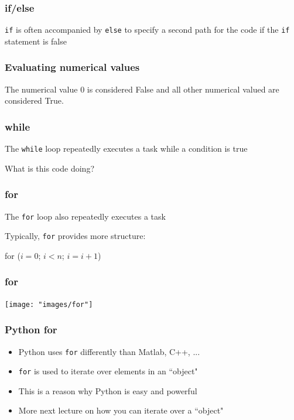 \documentclass{beamer}
\begin{document}
\begin{frame}
\frametitle{if/else}
\texttt{if} is often accompanied by \texttt{else} to specify a second path for the code if the \texttt{if} statement is false



\end{frame}

\begin{frame}
\frametitle{Evaluating numerical values}

The numerical value 0 is considered False and all other numerical valued are considered True.



\end{frame}

\begin{frame}
\frametitle{while}
The \texttt{while} loop repeatedly executes a task while a condition is true



What is this code doing?

\end{frame}

\begin{frame}
\frametitle{for}
The \texttt{for} loop also repeatedly executes a task

\vspace{0.1in}

Typically, \texttt{for} provides more structure:

\vspace{0.1in}

\centering
for ($i = 0$; $i < n$; $i = i + 1$)

\end{frame}

\begin{frame}
\frametitle{for}

\centering
\texttt{[image: "images/for"]}
\end{frame}

\begin{frame}
\frametitle{Python for}
\begin{itemize}
\setlength{\itemsep}{0.2in}
\item{Python uses \texttt{for} differently than Matlab, C++, ...}
\item{\texttt{for} is used to iterate over elements in an ``object"}
\item{This is a reason why Python is easy and powerful}
\item{More next lecture on how you can iterate over a ``object"}
\end{itemize}

\end{frame}
\end{document}
